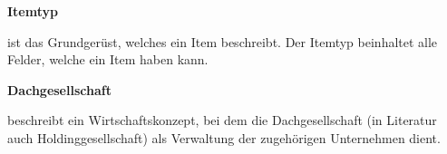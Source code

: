 \documentclass[11pt,a4paper]{report}
\begin{document}
\textbf{Itemtyp}
\par
\begingroup
\leftskip=1cm
\noindent ist das Grundgerüst, welches ein Item beschreibt.
Der Itemtyp beinhaltet alle Felder, welche ein Item haben kann.\\
\par
\endgroup

\textbf{Dachgesellschaft}
\par
\begingroup
\leftskip=1cm
\noindent beschreibt ein Wirtschaftskonzept, bei dem die Dachgesellschaft (in Literatur auch Holdinggesellschaft) als Verwaltung der zugehörigen Unternehmen dient.\\
\par
\endgroup
\end{document}
